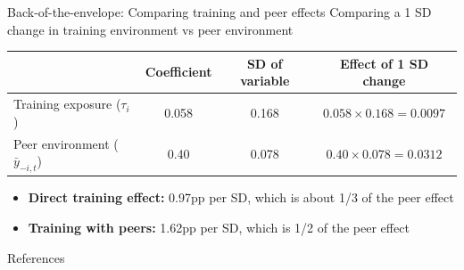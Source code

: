 \documentclass[10pt,aspectratio=169]{beamer}
\begin{document}
\begin{frame}[label=back-of-the-envelope]{Back-of-the-envelope: Comparing training and peer effects}
    Comparing a 1 SD change in training environment vs peer environment

    \begin{center}
    \small
    \begin{tabular}{lccc}
    \toprule
     & Coefficient & SD of variable & Effect of 1 SD change \\
    \midrule
    Training exposure ($\tau_i$) & 0.058 & 0.168 & $0.058 \times 0.168 = 0.0097$ \\
    Peer environment ($\bar{y}_{-i,t}$) & 0.40 & 0.078 & $0.40 \times 0.078 = 0.0312$ \\
    \bottomrule
    \end{tabular}
    \end{center}

    \medskip
    \begin{itemize}
        \item \textbf{Direct training effect:} 0.97pp per SD, which is about 1/3 of the peer effect
        \item \textbf{Training with peers:} 1.62pp per SD, which is 1/2 of the peer effect
    \end{itemize}

    \centering
    \hyperlink{conclusion}{}
\end{frame}

\begin{frame}[allowframebreaks]{References}
    \printbibliography[heading=none]
\end{frame}
\end{document}
